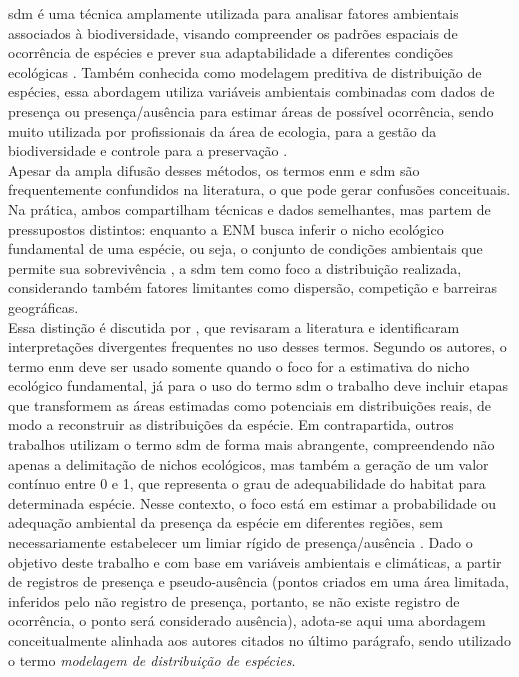 \gls{sdm} é uma técnica amplamente utilizada para analisar fatores ambientais associados à biodiversidade, visando compreender os padrões espaciais de ocorrência de espécies e prever sua adaptabilidade a diferentes condições ecológicas \cite{miyaji_2024}. Também conhecida como modelagem preditiva de distribuição de espécies, essa abordagem utiliza variáveis ambientais combinadas com dados de presença ou presença/ausência para estimar áreas de possível ocorrência, sendo muito utilizada por profissionais da área de ecologia, para a gestão da biodiversidade e controle para a preservação \cite{liu_white_newell_2010, elith_leathwick_2009}. \\
Apesar da ampla difusão desses métodos, os termos \gls{enm} e \gls{sdm} são frequentemente confundidos na literatura, o que pode gerar confusões conceituais. Na prática, ambos compartilham técnicas e dados semelhantes, mas partem de pressupostos distintos: enquanto a ENM busca inferir o nicho ecológico fundamental de uma espécie, ou seja, o conjunto de condições ambientais que permite sua sobrevivência \cite{fabiana:2009}, a \gls{sdm} tem como foco a distribuição realizada, considerando também fatores limitantes como dispersão, competição e barreiras geográficas.\\
Essa distinção é discutida por , que revisaram a literatura e identificaram interpretações divergentes frequentes no uso desses termos. Segundo os autores, o termo \gls{enm} deve ser usado somente quando o foco for a estimativa do nicho ecológico fundamental, já para o uso do termo \gls{sdm} o trabalho deve incluir etapas que transformem as áreas estimadas como potenciais em distribuições reais, de modo a reconstruir as distribuições da espécie.
Em contrapartida, outros trabalhos utilizam o termo \gls{sdm} de forma mais abrangente, compreendendo não apenas a delimitação de nichos ecológicos, mas também a geração de um valor contínuo entre 0 e 1, que representa o grau de adequabilidade do habitat para determinada espécie. Nesse contexto, o foco está em estimar a probabilidade ou adequação ambiental da presença da espécie em diferentes regiões, sem necessariamente estabelecer um limiar rígido de presença/ausência \cite{Ramampiandra:2023, beery_cole_parker_perona_winner_2021, sasso2022sdm, zhang:2017}.
Dado o objetivo deste trabalho e com base em variáveis ambientais e climáticas, a partir de registros de presença e pseudo-ausência (pontos criados em uma área limitada, inferidos pelo não registro de presença, portanto, se não existe registro de ocorrência, o ponto será considerado ausência), adota-se aqui uma abordagem conceitualmente alinhada aos autores citados no último parágrafo, sendo utilizado o termo \textit{modelagem de distribuição de espécies}. 


